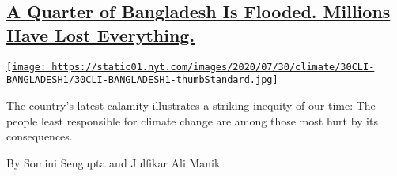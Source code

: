 \begin{enumerate}
\begin{enumerate}
{    \subsection{\texorpdfstring{\href{/2020/07/30/climate/bangladesh-floods.html}{A
    Quarter of Bangladesh Is Flooded. Millions Have Lost
    Everything.}}{A Quarter of Bangladesh Is Flooded. Millions Have Lost Everything.}}\label{a-quarter-of-bangladesh-is-flooded-millions-have-lost-everything}}

    \href{/2020/07/30/climate/bangladesh-floods.html}{\texttt{[image: https://static01.nyt.com/images/2020/07/30/climate/30CLI-BANGLADESH1/30CLI-BANGLADESH1-thumbStandard.jpg]}}

    The country's latest calamity illustrates a striking inequity of our
    time: The people least responsible for climate change are among
    those most hurt by its consequences.

    By Somini Sengupta and Julfikar Ali Manik
  \end{enumerate}
\end{enumerate}

